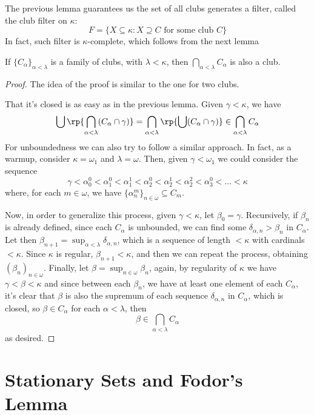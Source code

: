 The previous lemma guarantees us the set of all clubs generates a filter, called the club filter on $\kappa$:
$$F=\{X\subseteq\kappa:X\supseteq C\text{ for some club }C\}$$
In fact, such filter is $\kappa$-complete, which follows from the next lemma

\begin{lemma}{}{}\label{k-complete}
    If $\{C_\alpha\}_{\alpha<\lambda}$ is a family of clubs, with $\lambda<\kappa$, then $\bigcap_{\alpha<\lambda}C_\alpha$ is also a club.
\end{lemma}

\begin{proof}
    The idea of the proof is similar to the one for two clubs.
    
    That it's closed is as easy as in the previous lemma. Given $\gamma<\kappa$, we have
    $$\bigcup\rp{\bigcap_{\alpha<\lambda}(C_\alpha\cap\gamma)}=\bigcap_{\alpha<\lambda}\rp{\bigcup(C_\alpha\cap\gamma)}\in\bigcap_{\alpha<\lambda}C_\alpha$$
    For unboundedness we can also try to follow a similar approach. In fact, as a warmup, consider $\kappa=\omega_1$ and $\lambda=\omega$. Then, given $\gamma<\omega_1$ we could consider the sequence
    $$\gamma<\alpha_0^0<\alpha_1^0<\alpha_1^1<\alpha_2^0<\alpha_2^1<\alpha_2^2<\alpha_3^0<\dots<\kappa$$
    where, for each $m\in\omega$, we have $\{\alpha_n^m\}_{n\in\omega}\subseteq C_m$.

    Now, in order to generalize this process, given $\gamma<\kappa$, let $\beta_0=\gamma$. Recursively, if $\beta_n$ is already defined, since each $C_\alpha$ is unbounded, we can find some $\delta_{\alpha,n}>\beta_n$ in $C_\alpha$. Let then $\beta_{n+1}=\sup_{\alpha<\lambda}\delta_{\alpha,n}$, which is a sequence of length $<\!\kappa$ with cardinals $<\!\kappa$. Since $\kappa$ is regular, $\beta_{n+1}<\kappa$, and then we can repeat the process, obtaining $(\beta_n)_{n\in\omega}$. Finally, let $\beta=\sup_{n\in\omega}\beta_n$, again, by regularity of $\kappa$ we have $\gamma<\beta<\kappa$ and since between each $\beta_n$, we have at least one element of each $C_\alpha$, it's clear that $\beta$ is also the supremum of each sequence $\delta_{\alpha,n}$ in $C_\alpha$, which is closed, so $\beta\in C_\alpha$ for each $\alpha<\lambda$, then
    $$\beta\in\bigcap_{\alpha<\lambda}C_\alpha$$
    as desired.
\end{proof}

\section{Stationary Sets and Fodor's Lemma}

